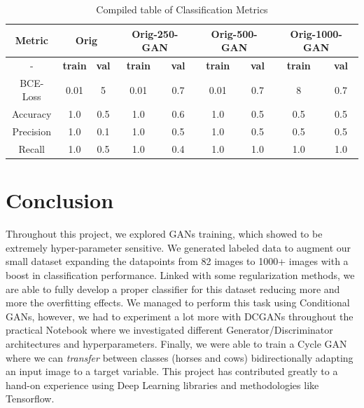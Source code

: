 \documentclass[conference]{IEEEtran}
\begin{document}
\begin{table}[h!]
\centering
\begin{tabular}{| *{9}{c|} }
    \hline
\textbf{Metric}    & \multicolumn{2}{c|}{Orig}
            & \multicolumn{2}{c|}{Orig-250-GAN}
                    & \multicolumn{2}{c|}{Orig-500-GAN}
                            & \multicolumn{2}{c|}{Orig-1000-GAN}                \\
    \hline
-   &   \textbf{train}  &   \textbf{val}  &   \textbf{train}  &   \textbf{val}  &   \textbf{train}  &   \textbf{val}  &   \textbf{train}  &   \textbf{val}  \\
    \hline
BCE-Loss   &   0.01  &   5  &   0.01  &   0.7  &  0.01   &  0.7   &   8  &  0.7   \\
    \hline
Accuracy   &    1.0   &     0.5  &   1.0    &     0.6  &   1.0    &    0.5   &   0.5    &   0.5    \\
    \hline
Precision   &   1.0    &   0.1    &   1.0    &    0.5   &   1.0    &    0.5   &   0.5    &    0.5   \\
    \hline
Recall   &    1.0   &    0.5   &    1.0   &   0.4   &    1.0   &    1.0   &    1.0   &  1.0     \\
    \hline

\end{tabular}
\caption{Compiled table of Classification Metrics}
\end{table}

\section{Conclusion}
Throughout this project, we explored GANs training, which showed to be extremely hyper-parameter sensitive. We generated labeled data to augment our small dataset expanding the datapoints from 82 images to 1000+ images with a boost in classification performance. Linked with some regularization methods, we are able to fully develop a proper classifier for this dataset reducing more and more the overfitting effects. We managed to perform this task using Conditional GANs, however, we had to experiment a lot more with DCGANs throughout the practical Notebook where we investigated different Generator/Discriminator architectures and hyperparameters. Finally, we were able to train a Cycle GAN where we can \textit{transfer} between classes (horses and cows) bidirectionally adapting an input image to a target variable. This project has contributed greatly to a hand-on experience using Deep Learning libraries and methodologies like Tensorflow.



\end{document}
